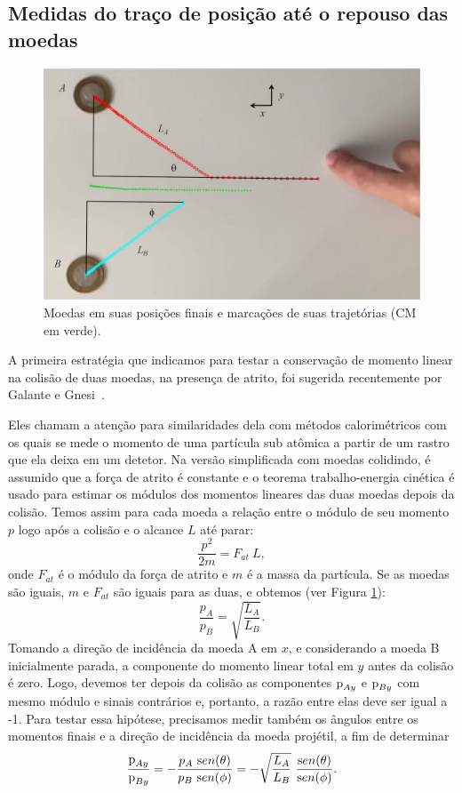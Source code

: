 \subsection{ Medidas do traço de posição até o repouso das moedas}

\begin{figure}
\centering
\includegraphics[width=0.5\columnwidth]{Figuras_exp4/figcolisaomoedas3.jpg}
\caption{\label{fig:figcolisaomoedas3} Moedas em suas posições finais e marcações de suas trajetórias (CM em verde).}
\end{figure}

A primeira estratégia que indicamos para testar a conservação de momento linear na colisão de duas moedas, na presença de atrito, foi sugerida recentemente por Galante e Gnesi~\cite{Galante2020}.

Eles chamam a atenção para similaridades dela com métodos calorimétricos com os quais se mede o momento de uma partícula sub atômica a partir de um rastro que ela deixa em um detetor. Na versão simplificada com moedas colidindo, é assumido que a força de atrito é constante e o teorema trabalho-energia cinética é usado para estimar os módulos dos momentos lineares das duas moedas depois da colisão. Temos assim para cada moeda a relação entre o módulo de seu momento $p$ logo após a colisão e o alcance $L$ até parar:
\begin{equation}
\frac{p^2}{2m} = F_{at}~L, 
\end{equation}
onde $F_{at}$ é o módulo da força de atrito e $m$ é a massa da partícula. Se as moedas são iguais, $m$ e $F_{at}$ são iguais para as duas, e obtemos (ver Figura \ref{fig:figcolisaomoedas3}):
\begin{equation}
\frac{p_A}{p_B} = \sqrt{\frac{L_A}{L_B}}.
\end{equation}
Tomando a direção de incidência da moeda A em $x$, e considerando a moeda B inicialmente parada, a componente do momento linear total em $y$ antes da colisão é zero. Logo, devemos ter depois da colisão as componentes ${\text p}_{Ay}$ e ${\text p}_{By}$ com mesmo módulo e sinais contrários e, portanto, a razão entre elas deve ser igual a -1. Para testar essa hipótese, precisamos medir também os ângulos entre os momentos finais e a direção de incidência da moeda projétil, a fim de determinar 
\begin{equation}
\frac{{\text p}_{Ay}}{{\text p}_{By}} = -\frac{p_A~{\text sen}(\theta)}{p_B~{\text sen}(\phi)} = - \sqrt{\frac{L_A}{L_B}}~\frac{{\text sen}(\theta)}{{\text sen}(\phi)}.
\end{equation}

